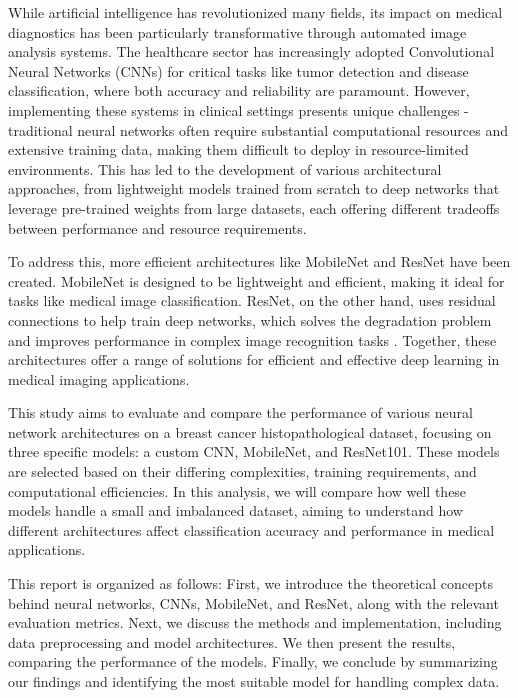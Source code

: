 While artificial intelligence has revolutionized many fields, its impact on medical diagnostics has been particularly transformative through automated image analysis systems. The healthcare sector has increasingly adopted Convolutional Neural Networks (CNNs) for critical tasks like tumor detection and disease classification, where both accuracy and reliability are paramount.\cite{SHARMA2024637} However, implementing these systems in clinical settings presents unique challenges - traditional neural networks often require substantial computational resources and extensive training data, making them difficult to deploy in resource-limited environments\cite{howard2017mobilenetsefficientconvolutionalneural}. This has led to the development of various architectural approaches, from lightweight models trained from scratch to deep networks that leverage pre-trained weights from large datasets, each offering different tradeoffs between performance and resource requirements.

To address this, more efficient architectures like MobileNet and ResNet have been created. MobileNet is designed to be lightweight and efficient, making it ideal for tasks like medical image classification. ResNet, on the other hand, uses residual connections to help train deep networks, which solves the degradation problem and improves performance in complex image recognition tasks \cite{he2015deepresiduallearningimage}. Together, these architectures offer a range of solutions for efficient and effective deep learning in medical imaging applications.

This study aims to evaluate and compare the performance of various neural network architectures on a breast cancer histopathological dataset, focusing on three specific models: a custom CNN, MobileNet, and ResNet101. These models are selected based on their differing complexities, training requirements, and computational efficiencies. In this analysis, we will compare how well these models handle a small and imbalanced dataset, aiming to understand how different architectures affect classification accuracy and performance in medical applications.

This report is organized as follows: First, we introduce the theoretical concepts behind neural networks, CNNs, MobileNet, and ResNet, along with the relevant evaluation metrics. Next, we discuss the methods and implementation, including data preprocessing and model architectures. We then present the results, comparing the performance of the models. Finally, we conclude by summarizing our findings and identifying the most suitable model for handling complex data.